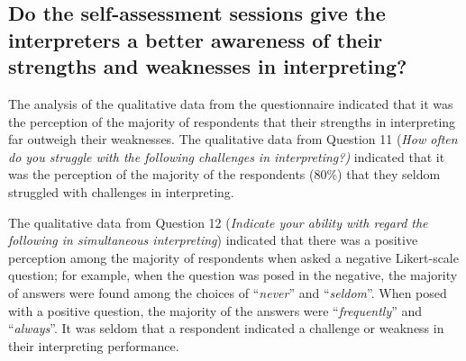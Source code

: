 \documentclass[output=paper]{langsci/langscibook}
\begin{document}
\begin{table}
\caption{\label{tab:deysel:6}Comparison of ratings for experimental and control group}
\end{table}

\subsection{Do the self-assessment sessions give the interpreters a better awareness of their strengths and weaknesses in interpreting?}

The analysis of the qualitative data from the questionnaire indicated that it was the perception of the majority of respondents that their strengths in interpreting far outweigh their weaknesses. The qualitative data from Question 11 (\textit{How often do you struggle with the following challenges in interpreting?)} indicated that it was the perception of the majority of the respondents (80\%) that they seldom struggled with challenges in interpreting. 

The qualitative data from Question 12 (\textit{Indicate your ability with regard the following in simultaneous interpreting}) indicated that there was a positive perception among the majority of respondents when asked a negative Likert-scale question; for example, when the question was posed in the negative, the majority of answers were found among the choices of “\textit{never}” and “\textit{seldom}”. When posed with a positive question, the majority of the answers were “\textit{frequently}” and “\textit{always}”. It was seldom that a respondent indicated a challenge or weakness in their interpreting performance. 
\end{document}
